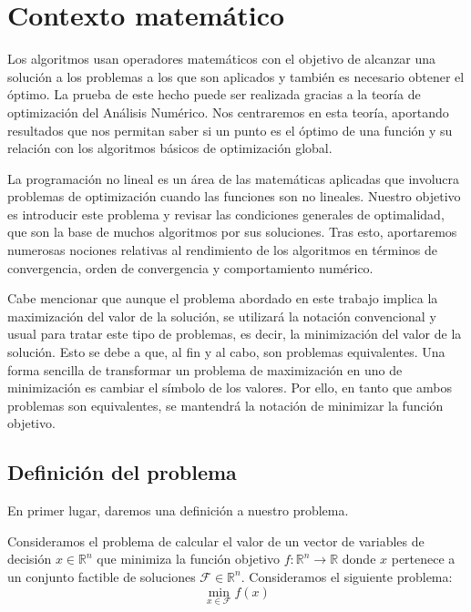 \chapter{Contexto matemático}

Los algoritmos usan operadores matemáticos con el objetivo de alcanzar una solución a los problemas a los que son aplicados y también es necesario obtener el óptimo. 
La prueba de este hecho puede ser realizada gracias a la teoría de optimización del Análisis Numérico. 
Nos centraremos en esta teoría, aportando resultados que nos permitan saber si un punto es el óptimo de una función y su relación con los algoritmos básicos de optimización global. 

La programación no lineal es un área de las matemáticas aplicadas que involucra problemas de optimización cuando las funciones son no lineales. 
Nuestro objetivo es introducir este problema y revisar las condiciones generales de optimalidad, que son la base de muchos algoritmos por sus soluciones. 
Tras esto, aportaremos numerosas nociones relativas al rendimiento de los algoritmos en términos de convergencia, orden de convergencia y comportamiento numérico.

Cabe mencionar que aunque el problema abordado en este trabajo implica la maximización del valor de la solución, se utilizará la notación convencional y usual para tratar este tipo de problemas, es decir, la minimización del valor de la solución. 
Esto se debe a que, al fin y al cabo, son problemas equivalentes. 
Una forma sencilla de transformar un problema de maximización en uno de minimización es cambiar el símbolo de los valores. 
Por ello, en tanto que ambos problemas son equivalentes, se mantendrá la notación de minimizar la función objetivo.

\section{Definición del problema}

En primer lugar, daremos una definición a nuestro problema.

\begin{definicion}
Consideramos el problema de calcular el valor de un vector de variables de decisión $x\in\mathbb{R}^n$ que minimiza la función objetivo $f:\mathbb{R}^n\xrightarrow{}{}\mathbb{R}$ donde $x$ pertenece a un conjunto factible de soluciones $\mathcal{F}\in\mathbb{R}^n$. 
Consideramos el siguiente problema:
\begin{equation}
\min_{x\in\mathcal{F}}f(x)
\label{eq:4.1}
\end{equation}
\end{definicion}

